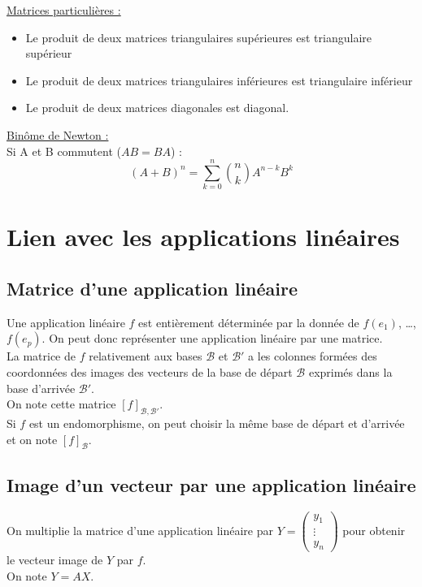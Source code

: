         \underline{Matrices particulières :}
        \begin{itemize}
            \item Le produit de deux matrices triangulaires supérieures est triangulaire supérieur
            \item Le produit de deux matrices triangulaires inférieures est triangulaire inférieur
            \item Le produit de deux matrices diagonales est diagonal\vspace{5pt}.
        \end{itemize}

        \underline{Binôme de Newton :}\\
        Si A et B commutent ($AB = BA$) :
        \[ (A + B)^n = \sum_{k=0}^{n} \binom{n}{k} A^{n-k} B^k \]


\section{Lien avec les applications linéaires}

    \subsection{Matrice d'une application linéaire}

        Une application linéaire $f$ est entièrement déterminée par la donnée de $f(e_1)$, \ldots, $f(e_p)$.
        On peut donc représenter une application linéaire par une matrice.\\

        La matrice de $f$ relativement aux bases $\mathcal{B}$ et $\mathcal{B}'$ a les colonnes formées des coordonnées des images des vecteurs de la base de départ $\mathcal{B}$ exprimés dans la base d'arrivée $\mathcal{B}'$.\\
        On note cette matrice $[f]_{\mathcal{B},\mathcal{B}'}$.\\

        Si $f$ est un endomorphisme, on peut choisir la même base  de départ et d'arrivée et on note $[f]_{\mathcal{B}}$.

    \subsection{Image d'un vecteur par une application linéaire}

        On multiplie la matrice d'une application linéaire par
        $Y = \begin{pmatrix}
                 y_1\\ \vdots\\ y_n
        \end{pmatrix}$
        pour obtenir le vecteur image de $Y$ par $f$.\\
        On note $Y = AX$.


